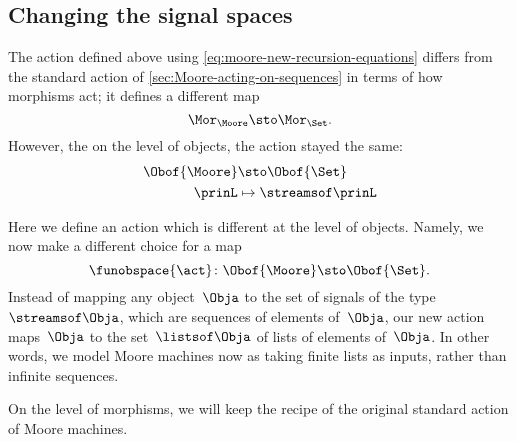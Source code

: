 
\subsection{Changing the signal spaces}

The action defined above using \cref{eq:moore-new-recursion-equations} differs from the standard action of \cref{sec:Moore-acting-on-sequences} in terms of how morphisms act; it defines a different map
\begin{equation}
    \Mor_\Moore \sto \Mor_\Set.
\end{equation}
However, the on the level of objects, the action stayed the same:
\begin{equation}
    \begin{aligned}
        \Obof{\Moore} & \sto \Obof{\Set} \\
        \prinL        & \mapsto \streamsof\prinL
    \end{aligned}
\end{equation}

Here we define an action which is different at the level of objects.
Namely, we now make a different choice for a map
\begin{equation}
    \funobspace{\act} \colon \Obof{\Moore} \sto \Obof{\Set}.
\end{equation}
Instead of mapping any object~$\Obja$ to the set of signals of the type~$\streamsof\Obja$, which are sequences of elements of~$\Obja$, our new action maps~$\Obja$ to the set~$\listsof\Obja$ of lists of elements of~$\Obja$.
In other words, we model Moore machines now as taking finite lists as inputs, rather than infinite sequences.

On the level of morphisms, we will keep the recipe of the original standard action of Moore machines.

